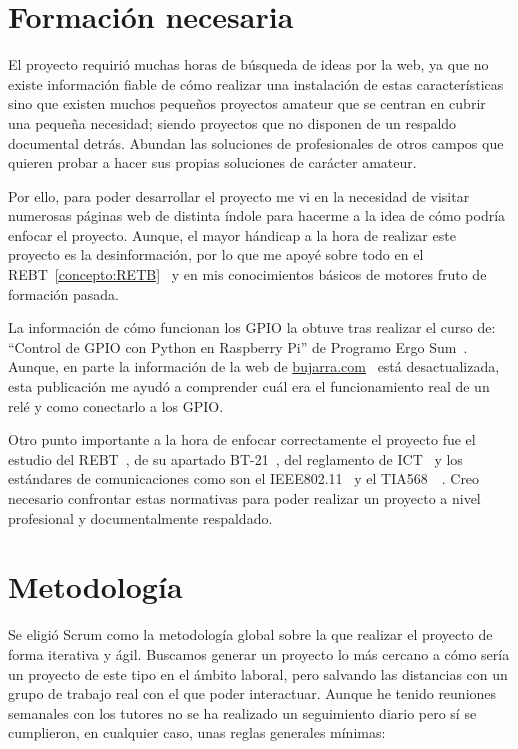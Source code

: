 \section{Formación necesaria}
El proyecto requirió muchas horas de búsqueda de ideas por la web, ya que no existe información fiable de cómo realizar una instalación de estas características sino que existen muchos pequeños proyectos amateur que se centran en cubrir una pequeña necesidad; siendo proyectos que no disponen de un respaldo documental detrás. Abundan las soluciones de profesionales de otros campos que quieren probar a hacer sus propias soluciones de carácter amateur.

Por ello, para poder desarrollar el proyecto me vi en la necesidad de visitar numerosas páginas web de distinta índole para hacerme a la idea de cómo podría enfocar el proyecto. Aunque, el mayor hándicap a la hora de realizar este proyecto es la desinformación, por lo que me apoyé sobre todo en el REBT~\ref{concepto:RETB}~\cite{manual:REBT} y en mis conocimientos básicos de motores fruto de formación pasada.

La información de cómo funcionan los GPIO la obtuve tras realizar el curso de: “Control de GPIO con Python en Raspberry Pi” de Programo Ergo Sum~\cite{misc:programoergosum}.
Aunque, en parte la información de la web de \url{bujarra.com}~\cite{misc:BujarraGPIO} está desactualizada, esta publicación me ayudó a comprender cuál era el funcionamiento real de un relé y como conectarlo a los GPIO.

Otro punto importante a la hora de enfocar correctamente el proyecto fue el estudio del REBT~\cite{manual:REBT}, de su apartado BT-21~\cite{manual:ICT-BT-21}, del reglamento de ICT~\cite{manual:ICT} y los estándares de comunicaciones como son el IEEE802.11~\cite{manual:IEEE802.11} y el TIA568~\cite{manual:568.1}~\cite{manual:568.2}. Creo necesario confrontar estas normativas para poder realizar un proyecto a nivel profesional y documentalmente respaldado.

\section{Metodología}
Se eligió Scrum como la metodología global sobre la que realizar el proyecto de forma iterativa y ágil. Buscamos generar un proyecto lo más cercano a cómo sería un proyecto de este tipo en el ámbito laboral, pero salvando las distancias con un grupo de trabajo real con el que poder interactuar. Aunque he tenido reuniones semanales con los tutores no se ha realizado un seguimiento diario pero sí se cumplieron, en cualquier caso, unas reglas generales mínimas:

